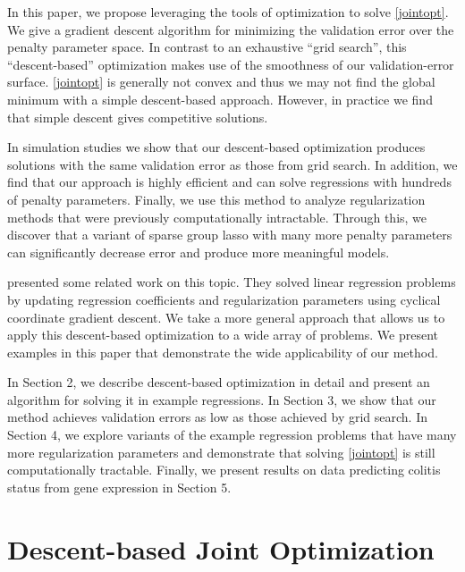 \documentclass[10pt,letterpaper]{article}
\begin{document}
In this paper, we propose leveraging the tools of optimization to solve \eqref{jointopt}. We give a gradient descent algorithm for minimizing the validation error over the penalty parameter space. In contrast to an exhaustive ``grid search'', this ``descent-based'' optimization makes use of the smoothness of our validation-error surface. \eqref{jointopt} is generally not convex and thus we may not find the global minimum with a simple descent-based approach. However, in practice we find that simple descent gives competitive solutions.

In simulation studies we show that our descent-based optimization produces solutions with the same validation error as those from grid search. In addition, we find that our approach is highly efficient and can solve regressions with hundreds of penalty parameters. Finally, we use this method to analyze regularization methods that were previously computationally intractable. Through this, we discover that a variant of sparse group lasso with many more penalty parameters can significantly decrease error and produce more meaningful models.

\citet{lorbert2010descent} presented some related work on this topic. They solved linear regression problems by updating regression coefficients and regularization parameters using cyclical coordinate gradient descent. We take a more general approach that allows us to apply this descent-based optimization to a wide array of problems. We present examples in this paper that demonstrate the wide applicability of our method.

In Section 2, we describe descent-based optimization in detail and present an algorithm for solving it in example regressions. In Section 3, we show that our method achieves validation errors as low as those achieved by grid search. In Section 4, we explore variants of the example regression problems that have many more regularization parameters and demonstrate that solving \eqref{jointopt} is still computationally tractable. Finally, we present results on data predicting colitis status from gene expression in Section 5.

\section{Descent-based Joint Optimization}
\end{document}
